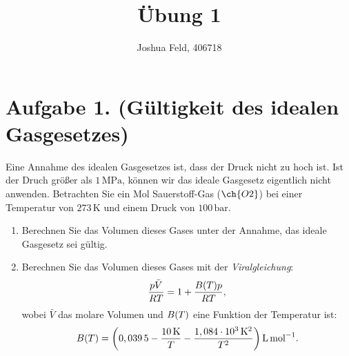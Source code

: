 \documentclass[german,12pt]{homework}
\title{Übung 1}
\author{Joshua Feld, 406718}
\institute{RWTH Aachen University\\Aachener Verfahrenstechnik}
\DeclarePairedDelimiter{\enbrace}{(}{)}
\newcommand{\sis}[1]{\,\si{#1}}
\begin{document}
    \maketitle

    \section*{Aufgabe 1. (Gültigkeit des idealen Gasgesetzes)}

    \begin{problem}
        Eine Annahme des idealen Gasgesetzes ist, dass der Druck nicht zu hoch
        ist. Ist der Druch größer als \(1\sis{\mega\pascal}\), können wir das
        ideale Gasgesetz eigentlich nicht anwenden. Betrachten Sie ein Mol
        Sauerstoff-Gas (\(\ch{O2}\)) bei einer Temperatur von
        \(273\sis{\kelvin}\) und einem Druck von \(100\sis{\bar}\).
        \begin{enumerate}
            \item Berechnen Sie das Volumen dieses Gases unter der Annahme, das
            ideale Gasgesetz sei gültig.
            \item Berechnen Sie das Volumen dieses Gases mit der
            \emph{Viralgleichung}:
            \[\frac{p\bar{V}}{RT} = 1 + \frac{B\enbrace*{T}p}{RT},\]
            wobei \(\bar{V}\) das molare Volumen und \(B\enbrace*{T}\) eine
            Funktion der Temperatur ist:
            \[B\enbrace*{T} = \enbrace*{0,039\,5 - \frac{10\sis{\kelvin}}{T}
            - \frac{1,084 \cdot 10^3\sis{\kelvin\squared}}{T^2}}
            \sis{\liter\per\mole}.\]
        \end{enumerate}
    \end{problem}
\end{document}
